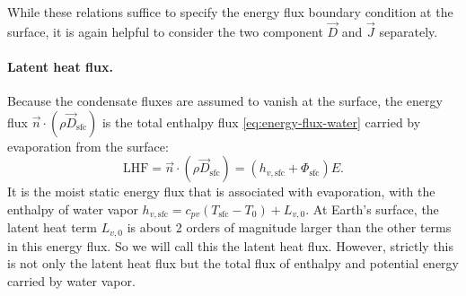 \documentclass{article}
\begin{document}
While these relations suffice to specify the energy flux boundary condition at the surface, it is again helpful to consider the two component $\vec{D}$ and $\vec{J}$ separately. 

\paragraph{Latent heat flux.} Because the condensate fluxes are assumed to vanish at the surface, the energy flux $\vec{n} \cdot (\rho \vec{D}_{\mathrm{sfc}})$ is the total enthalpy flux \eqref{eq:energy-flux-water} carried by evaporation from the surface:
\begin{equation}\label{e:sfc_LHF}
     \mathrm{LHF} = \vec{n} \cdot (\rho \vec{D}_{\mathrm{sfc}})   = (h_{v, \mathrm{sfc}} + \Phi_\mathrm{sfc}) E.
\end{equation}
It is the moist static energy flux that is associated with evaporation, with the enthalpy of water vapor $h_{v, \mathrm{sfc}} = c_{pv} (T_\mathrm{sfc}-T_0) + L_{v,0}$. At Earth's surface, the latent heat term $L_{v,0}$ is about 2 orders of magnitude larger than the other terms in this energy flux. So we will call this the latent heat flux. However, strictly this is not only the latent heat flux but the total flux of enthalpy and potential energy carried by water vapor.
\end{document}
